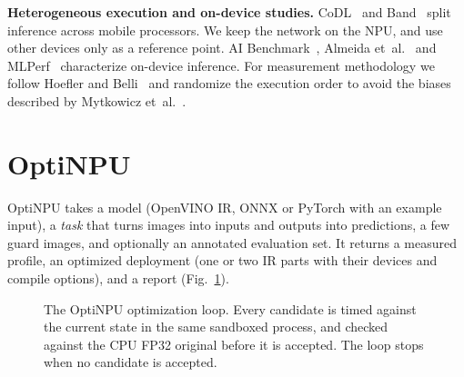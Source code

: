 \documentclass[conference]{IEEEtran}
\newcommand{\tool}{OptiNPU}
\begin{document}
\textbf{Heterogeneous execution and on-device studies.} CoDL~\cite{jia2022codl} and Band~\cite{jeong2022band} split inference across mobile processors. We keep the network on the NPU, and use other devices only as a reference point. AI Benchmark~\cite{ignatov2019aibenchmark}, Almeida et~al.~\cite{almeida2021smart} and MLPerf~\cite{reddi2020mlperf} characterize on-device inference. For measurement methodology we follow Hoefler and Belli~\cite{hoefler2015scientific} and randomize the execution order to avoid the biases described by Mytkowicz et~al.~\cite{mytkowicz2009wrong}.

\section{OptiNPU}

\tool{} takes a model (OpenVINO IR, ONNX or PyTorch with an example input), a \emph{task} that turns images into inputs and outputs into predictions, a few guard images, and optionally an annotated evaluation set. It returns a measured profile, an optimized deployment (one or two IR parts with their devices and compile options), and a report (Fig.~\ref{fig:overview}).

\begin{figure}[t]
\centering
{}
\caption{The \tool{} optimization loop. Every candidate is timed against the current state in the same sandboxed process, and checked against the CPU FP32 original before it is accepted. The loop stops when no candidate is accepted.}
\label{fig:overview}
\end{figure}
\end{document}
